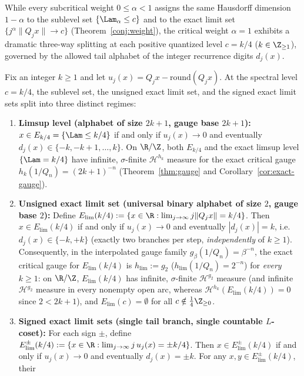 While every subcritical weight $0\le\alpha<1$ assigns the same Hausdorff
dimension $1-\alpha$ to the sublevel set $\{\Lam_\alpha\le c\}$ and to the
exact limit set $\{j^\alpha\|Q_jx\|\to c\}$ (Theorem~\ref{conj:weight}), the
critical weight $\alpha=1$ exhibits a dramatic three-way splitting at each
positive quantized level $c=k/4$ ($k\in\Z_{\ge1}$), governed by the allowed
tail alphabet of the integer recurrence digits $d_j(x)$.

\begin{theorem}\label{thm:trichotomy}
Fix an integer $k\ge1$ and let $u_j(x)=Q_jx-\mathrm{round}(Q_jx)$. At the
spectral level $c=k/4$, the sublevel set, the unsigned exact limit set, and
the signed exact limit sets split into three distinct regimes:
\begin{enumerate}[label=(\roman*),leftmargin=2em]
\item \textbf{Limsup level (alphabet of size $2k+1$, gauge base $2k+1$):}
$x\in E_{k/4}=\{\Lam\le k/4\}$ if and only if $u_j(x)\to0$ and eventually
$d_j(x)\in\{-k,-k+1,\dots,k\}$. On $\R/\Z$, both $E_{k/4}$ and the exact
limsup level $\{\Lam=k/4\}$ have infinite, $\sigma$-finite $\mathcal H^{h_k}$
measure for the exact critical gauge $h_k(1/Q_n)=(2k+1)^{-n}$
(Theorem~\ref{thm:gauge} and Corollary~\ref{cor:exact-gauge}).
\item \textbf{Unsigned exact limit set (universal binary alphabet of size $2$, gauge base $2$):}
Define $E_{\mathrm{lim}}(k/4):=\{x\in\R:\lim_{j\to\infty}j\|Q_jx\|=k/4\}$.
Then $x\in E_{\mathrm{lim}}(k/4)$ if and only if $u_j(x)\to0$ and eventually
$|d_j(x)|=k$, i.e.\ $d_j(x)\in\{-k,+k\}$ (exactly two branches per step,
\emph{independently} of $k\ge1$). Consequently, in the interpolated gauge
family $g_\beta(1/Q_n)=\beta^{-n}$, the exact critical gauge for
$E_{\mathrm{lim}}(k/4)$ is $h_{\mathrm{lim}}:=g_2$ ($h_{\mathrm{lim}}(1/Q_n)=2^{-n}$)
for \emph{every} $k\ge1$: on $\R/\Z$, $E_{\mathrm{lim}}(k/4)$ has infinite,
$\sigma$-finite $\mathcal H^{g_2}$ measure (and infinite $\mathcal H^{g_2}$
measure in every nonempty open arc, whereas
$\mathcal H^{h_k}(E_{\mathrm{lim}}(k/4))=0$ since $2<2k+1$), and
$E_{\mathrm{lim}}(c)=\emptyset$ for all $c\notin\frac14\Z_{\ge0}$.
\item \textbf{Signed exact limit sets (single tail branch, single countable $L$-coset):}
For each sign $\pm$, define
$E_{\mathrm{lim}}^\pm(k/4):=\{x\in\R:\lim_{j\to\infty}j\,u_j(x)=\pm k/4\}$.
Then $x\in E_{\mathrm{lim}}^\pm(k/4)$ if and only if $u_j(x)\to0$ and
eventually $d_j(x)=\pm k$. For any $x,y\in E_{\mathrm{lim}}^\pm(k/4)$, their

\end{enumerate}
\end{theorem}

